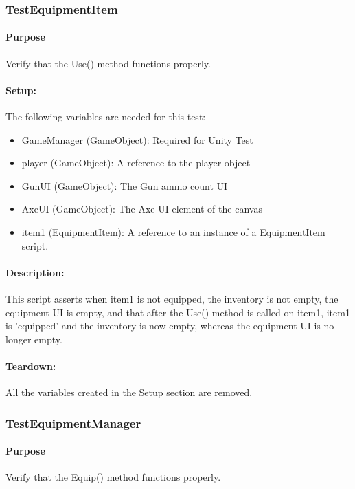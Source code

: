 \documentclass[12pt, titlepage]{article}
\begin{document}

\subsubsection{Test\textunderscore EquipmentItem}

\paragraph{Purpose} Verify that the Use() method functions properly.

\paragraph{Setup: } The following variables are needed for this test:
\begin{itemize}
	\item GameManager (GameObject): Required for Unity Test
	\item  player (GameObject): A reference to the player object
	\item  GunUI (GameObject): The Gun ammo count UI
	\item AxeUI (GameObject): The Axe UI element of the canvas
	\item item1 (EquipmentItem): A reference to an instance of a EquipmentItem script.
	
\end{itemize}
\paragraph{Description: }
This script asserts when item1 is not equipped, the inventory is not empty, the equipment UI is empty, and that after the Use() method is called on item1, item1 is 'equipped' and the inventory is now empty, whereas the equipment UI is no longer empty.
 
\paragraph{Teardown: } All the variables created in the Setup section are removed.


\subsubsection{Test\textunderscore EquipmentManager}

\paragraph{Purpose} Verify that the Equip() method functions properly.
\end{document}
